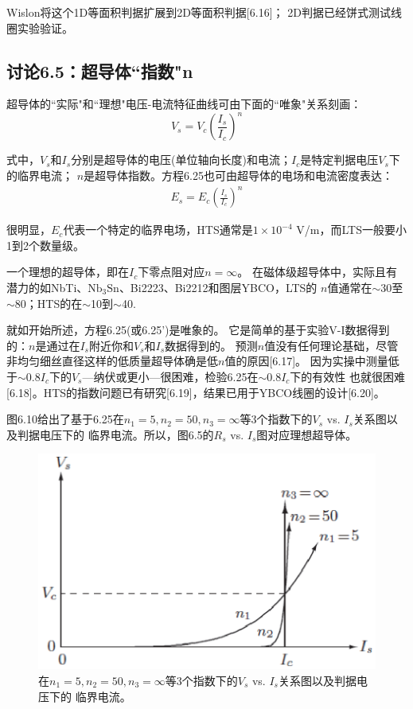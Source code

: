 Wislon将这个1D等面积判据扩展到2D等面积判据[6.16]；
2D判据已经饼式测试线圈实验验证。

\subsection{讨论6.5：超导体``指数"n}
超导体的``实际"和``理想"电压-电流特征曲线可由下面的``唯象"关系刻画：
\begin{equation}%
V_s=V_c(\frac{I_s}{I_c})^n
\end{equation}

式中，$V_s$和$I_s$分别是超导体的电压(单位轴向长度)和电流；$I_c$是特定判据电压$V_s$下的临界电流；
$n$是超导体指数。方程6.25也可由超导体的电场和电流密度表达：
\begin{align*}%
E_s=E_c(\frac{I_s}{I_c})^n \tag{6.25'}
\end{align*}

很明显，$E_c$代表一个特定的临界电场，HTS通常是$1\times 10^{-4}$ V/m，而LTS一般要小1到2个数量级。

一个理想的超导体，即在$I_c$下零点阻对应$n=\infty$。
在磁体级超导体中，实际且有潜力的如NbTi、$\mathrm{Nb_3 Sn}$、Bi2223、Bi2212和图层YBCO，LTS的
$n$值通常在$\sim$30至$\sim$80；HTS的在$\sim$10到$\sim$40.

就如开始所述，方程6.25(或6.25')是唯象的。
它是简单的基于实验V-I数据得到的：$n$是通过在$I_s$附近你和$V_s$和$I_s$数据得到的。
预测$n$值没有任何理论基础，尽管非均匀细丝直径这样的低质量超导体确是低$n$值的原因[6.17]。
因为实操中测量低于$\sim 0.8 I_c$下的$V_s$---纳伏或更小---很困难，检验6.25在$\sim 0.8 I_c$下的有效性
也就很困难[6.18]。HTS的指数问题已有研究[6.19]，结果已用于YBCO线圈的设计[6.20]。

图6.10给出了基于6.25在$n_1=5,n_2=50,n_3=\infty$等3个指数下的$V_s$ vs. $I_s$关系图以及判据电压下的
临界电流。所以，图6.5的$R_s$ vs. $I_s$图对应理想超导体。
\begin{figure}[htbp]
	\centering
	\includegraphics[scale=0.7]{chpt6/figs/fig6.10.eps}
	\caption{在$n_1=5,n_2=50,n_3=\infty$等3个指数下的$V_s$ vs. $I_s$关系图以及判据电压下的
		临界电流。}
\end{figure}

